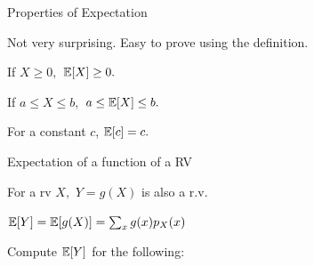 \begin{frame}{Properties of Expectation}

Not very surprising. Easy to prove using the definition.

\plitemsep 0.7in
\bci [$\circ$]

\item If $X \geq 0,$ $\mathbb{E}[ X ] \geq 0.$

\item If $a \le X \le b,$ $a \le \mathbb{E}[ X ] \le b.$

\item For a constant $c$, $\mathbb{E}[ c ] = c.$
\eci 

\end{frame}

\begin{frame}{Expectation of a function of a RV}

\plitemsep 0.05in
\bci 

\item<1-> For a rv $X,$ $Y =g (X)$ is also a r.v.

\item<2-> $\mathbb{E}[ Y ] = \mathbb{E}[ g(X) ] = \sum_{x} g(x) p_X(x)$ 

\item<3-> Compute $\mathbb{E}[ Y ]$ for the following:

{
}

\eci 

\end{frame}

